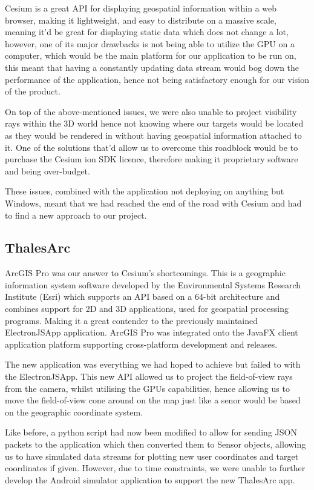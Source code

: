 \documentclass{l3proj}
\begin{document}
Cesium is a great API for displaying geospatial information within a web browser, making it lightweight, and easy to distribute on a massive scale, meaning it'd be great for displaying static data which does not change a lot, however, one of its major drawbacks is not being able to utilize the GPU on a computer, which would be the main platform for our application to be run on, this meant that having a constantly updating data stream would bog down the performance of the application, hence not being satisfactory enough for our vision of the product.

On top of the above-mentioned issues, we were also unable to project visibility rays within the 3D world hence not knowing where our targets would be located as they would be rendered in without having geospatial information attached to it. One of the solutions that'd allow us to overcome this roadblock would be to purchase the Cesium ion SDK licence\cite{ion}, therefore making it proprietary software and being over-budget.

These issues, combined with the application not deploying on anything but Windows, meant that we had reached the end of the road with Cesium and had to find a new approach to our project.

\subsection{ThalesArc}

ArcGIS Pro was our answer to Cesium’s shortcomings.\cite{arcgis} This is a geographic information system software developed by the Environmental Systems Research Institute (Esri)\cite{esri} which supports an API based on a 64-bit architecture and combines support for 2D and 3D applications, used for geospatial processing programs. Making it a great contender to the previously maintained ElectronJSApp application. ArcGIS Pro was integrated onto the JavaFX client application platform supporting cross-platform development and releases.\cite{javaFX}

The new application was everything we had hoped to achieve but failed to with the ElectronJSApp. This new API allowed us to project the field-of-view rays from the camera, whilst utilising the GPUs capabilities, hence allowing us to move the field-of-view cone around on the map just like a senor would be based on the geographic coordinate system.

Like before, a python script had now been modified to allow for sending JSON packets to the application which then converted them to Sensor objects, allowing us to have simulated data streams for plotting new user coordinates and target coordinates if given. However, due to time constraints, we were unable to further develop the Android simulator application to support the new ThalesArc app.
\end{document}
